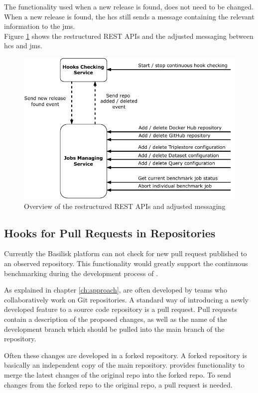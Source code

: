 The functionality used when a new release is found, does not need to be changed.
When a new release is found, the \ac{hcs} still sends a message containing the relevant information to the \ac{jms}.
\\

Figure \ref{fig:repo_management_restructure} shows the restructured REST APIs and the adjusted messaging between \ac{hcs} and \ac{jms}.

\begin{figure}[tbph]
	\centering
	\includegraphics[width=.65\textwidth]{figures/messaging-implementation-hcs-jms.pdf}
	\caption{Overview of the restructured REST APIs and adjusted messaging}
	\label{fig:repo_management_restructure}
\end{figure}


\subsection{Hooks for Pull Requests in \gh{} Repositories}
Currently the Basilisk platform can not check for new pull request published to an observed repository.
This functionality would greatly support the continuous benchmarking during the development process of \tsp{}.

As explained in chapter \ref{ch:approach}, \tsp{} are often developed by teams who collaboratively work on Git repositories.
A standard way of introducing a newly developed feature to a source code repository is a pull request.
Pull requests contain a description of the proposed changes, as well as the name of the development branch which should be pulled into the main branch of the repository.

Often these changes are developed in a forked repository.
A forked repository is basically an independent copy of the main repository.
\gh{} provides functionality to merge the latest changes of the original repo into the forked repo.
To send changes from the forked repo to the original repo, a pull request is needed.

